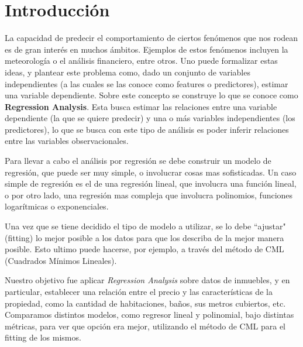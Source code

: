 \section{Introducción}

La capacidad de predecir el comportamiento de ciertos fenómenos que nos rodean es de gran interés en muchos ámbitos. Ejemplos de estos fenómenos incluyen la meteorología o el análisis financiero, entre otros. Uno puede formalizar estas ideas, y plantear este problema como, dado un conjunto de variables independientes (a las cuales se las conoce como features o predictores), estimar una variable dependiente. Sobre este concepto se construye lo que se conoce como \textbf{Regression Analysis}. Esta busca estimar las relaciones entre una variable dependiente (la que se quiere predecir) y una o más variables independientes (los predictores), lo que se busca con este tipo de análisis es poder inferir relaciones entre las variables observacionales.

Para llevar a cabo el análisis por regresión se debe construir un modelo de regresión, que puede ser muy simple, o involucrar cosas mas sofisticadas. Un caso simple de regresión es el de una regresión lineal, que involucra una función lineal, o por otro lado, una regresión mas compleja que involucra polinomios, funciones logarítmicas o exponenciales. 

Una vez que se tiene decidido el tipo de modelo a utilizar, se lo debe ``ajustar" (fitting) lo mejor posible a los datos para que los describa de la mejor manera posible. Esto ultimo puede hacerse, por ejemplo, a través del método de CML (Cuadrados Mínimos Lineales).

Nuestro objetivo fue aplicar \textit{Regression Analysis} sobre datos de inmuebles, y en particular, establecer una relación entre el precio y las características de la propiedad, como la cantidad de habitaciones, baños, sus metros cubiertos, etc. Comparamos distintos modelos, como regresor lineal y polinomial, bajo distintas métricas, para ver que opción era mejor, utilizando el método de CML para el fitting de los mismos.